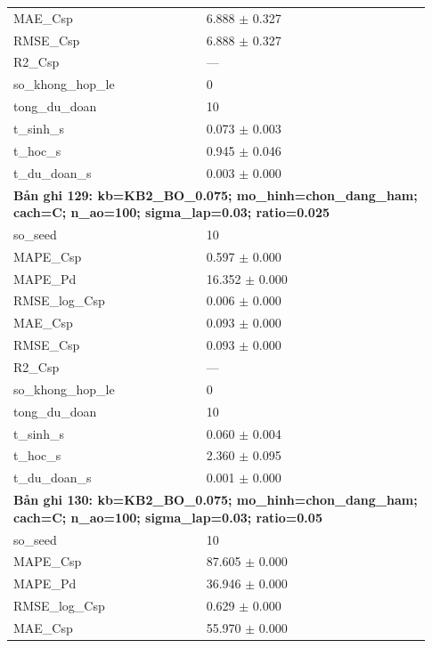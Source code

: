 \begin{longtable}{p{0.43\linewidth}p{0.50\linewidth}}
MAE\_\allowbreak Csp & 6.888 $\pm$ 0.327 \\
RMSE\_\allowbreak Csp & 6.888 $\pm$ 0.327 \\
R2\_\allowbreak Csp & — \\
so\_\allowbreak khong\_\allowbreak hop\_\allowbreak le & 0 \\
tong\_\allowbreak du\_\allowbreak doan & 10 \\
t\_\allowbreak sinh\_\allowbreak s & 0.073 $\pm$ 0.003 \\
t\_\allowbreak hoc\_\allowbreak s & 0.945 $\pm$ 0.046 \\
t\_\allowbreak du\_\allowbreak doan\_\allowbreak s & 0.003 $\pm$ 0.000 \\
\midrule
\multicolumn{2}{p{0.95\linewidth}}{\textbf{Bản ghi 129: kb=KB2\_BO\_0.075; mo\_hinh=chon\_dang\_ham; cach=C; n\_ao=100; sigma\_lap=0.03; ratio=0.025}} \\
so\_\allowbreak seed & 10 \\
MAPE\_\allowbreak Csp & 0.597 $\pm$ 0.000 \\
MAPE\_\allowbreak Pd & 16.352 $\pm$ 0.000 \\
RMSE\_\allowbreak log\_\allowbreak Csp & 0.006 $\pm$ 0.000 \\
MAE\_\allowbreak Csp & 0.093 $\pm$ 0.000 \\
RMSE\_\allowbreak Csp & 0.093 $\pm$ 0.000 \\
R2\_\allowbreak Csp & — \\
so\_\allowbreak khong\_\allowbreak hop\_\allowbreak le & 0 \\
tong\_\allowbreak du\_\allowbreak doan & 10 \\
t\_\allowbreak sinh\_\allowbreak s & 0.060 $\pm$ 0.004 \\
t\_\allowbreak hoc\_\allowbreak s & 2.360 $\pm$ 0.095 \\
t\_\allowbreak du\_\allowbreak doan\_\allowbreak s & 0.001 $\pm$ 0.000 \\
\midrule
\multicolumn{2}{p{0.95\linewidth}}{\textbf{Bản ghi 130: kb=KB2\_BO\_0.075; mo\_hinh=chon\_dang\_ham; cach=C; n\_ao=100; sigma\_lap=0.03; ratio=0.05}} \\
so\_\allowbreak seed & 10 \\
MAPE\_\allowbreak Csp & 87.605 $\pm$ 0.000 \\
MAPE\_\allowbreak Pd & 36.946 $\pm$ 0.000 \\
RMSE\_\allowbreak log\_\allowbreak Csp & 0.629 $\pm$ 0.000 \\
MAE\_\allowbreak Csp & 55.970 $\pm$ 0.000 \\

\end{longtable}
